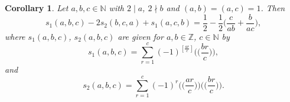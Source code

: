 \documentclass[reqno]{amsart}
\numberwithin{equation}{section}
\newtheorem{corollary}[thm]{Corollary}
\begin{document}
\begin{corollary}\label{cor2.3} Let $a,b,c\in\mathbb{N}$ with $2\mid a$, $2\nmid b$ and $(a,b)=(a,c)=1$. Then
\begin{equation}\label{eq2.7}
s_{1}(a,b,c)-2s_{2}(b,c,a)+s_{1}(a,c,b)=\frac{1}{2}-\frac{1}{2}\biggl(\frac{c}{ab}+\frac{b}{ac}\biggl),
\end{equation}
where $s_{1}(a,b,c)$, $s_{2}(a,b,c)$ are given for $a,b\in\mathbb{Z}$, $c\in\mathbb{N}$ by
\begin{equation*}
s_{1}(a,b,c)=\sum_{r=1}^{c}(-1)^{[\frac{ar}{c}]}\biggl(\biggl(\frac{br}{c}\biggl)\biggl),
\end{equation*}
and
\begin{equation*}
s_{2}(a,b,c)=\sum_{r=1}^{c}(-1)^{r}\biggl(\biggl(\frac{ar}{c}\biggl)\biggl)\biggl(\biggl(\frac{br}{c}\biggl)\biggl).
\end{equation*}
\end{corollary}
\end{document}
